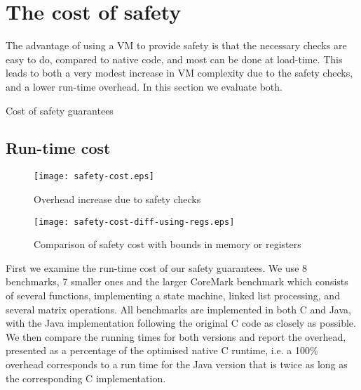 \section{The cost of safety}
\label{sec-evaluation-safety}

The advantage of using a VM to provide safety is that the necessary checks are easy to do, compared to native code, and most can be done at load-time. This leads to both a very modest increase in VM complexity due to the safety checks, and a lower run-time overhead. In this section we evaluate both.


\begin{landscape}
\begin{table*}[]
 \centering
 \caption{Cost of safety guarantees}
 \label{tbl-safety-cost}
 
\end{table*}
\end{landscape}


\subsection{Run-time cost}
\label{sec-evaluation-run-time-cost}
\begin{figure}[]
  \centering
  \texttt{[image: safety-cost.eps]}
  \caption{Overhead increase due to safety checks}
  \label{fig-safety-cost-per-benchmark}
\end{figure}

\begin{figure}[]
   \centering
  \texttt{[image: safety-cost-diff-using-regs.eps]}
  \caption{Comparison of safety cost with bounds in memory or registers}
  \label{fig-safety-cost-memory-or-registers}
\end{figure}

First we examine the run-time cost of our safety guarantees. We use 8 benchmarks, 7 smaller ones and the larger CoreMark benchmark \cite{coremark} which consists of several functions, implementing a state machine, linked list processing, and several matrix operations. All benchmarks are implemented in both C and Java, with the Java implementation following the original C code as closely as possible. We then compare the running times for both versions and report the overhead, presented as a percentage of the optimised native C runtime, i.e. a 100\% overhead corresponds to a run time for the Java version that is twice as long as the corresponding C implementation.

